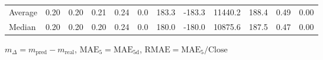 \begin{threeparttable}
{\begin{tabular}{lrrrrrrrrrrr}
Average &          0.20 &          0.20 &          0.21 &        0.24 &                 0.0 &               183.3 &     -183.3 &             11440.2 &            188.4 &            0.49 &                   0.00 \\
 Median &          0.20 &          0.20 &          0.20 &        0.24 &                 0.0 &               180.0 &     -180.0 &             10875.6 &            187.5 &            0.47 &                   0.00 \\
\bottomrule
\end{tabular}
}
\begin{tablenotes}\footnotesize
\item $m_\Delta=m_{\text{pred}}-m_{\text{real}}$,
$\mathrm{MAE}_5=\mathrm{MAE}_{5\text{d}}$,
$\mathrm{RMAE}=\mathrm{MAE}_5/\text{Close}$
\end{tablenotes}
\end{threeparttable}
\endgroup

